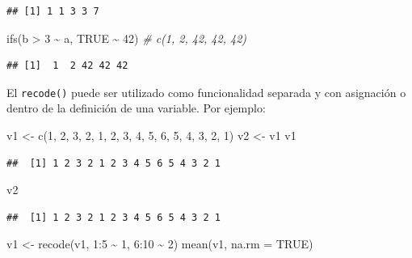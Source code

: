 \documentclass[
]{book}
\newenvironment{Shaded}{\begin{snugshade}}{\end{snugshade}}
\newcommand{\AttributeTok}[1]{\textcolor[rgb]{0.77,0.63,0.00}{#1}}
\newcommand{\CommentTok}[1]{\textcolor[rgb]{0.56,0.35,0.01}{\textit{#1}}}
\newcommand{\ConstantTok}[1]{\textcolor[rgb]{0.00,0.00,0.00}{#1}}
\newcommand{\DecValTok}[1]{\textcolor[rgb]{0.00,0.00,0.81}{#1}}
\newcommand{\FunctionTok}[1]{\textcolor[rgb]{0.00,0.00,0.00}{#1}}
\newcommand{\NormalTok}[1]{#1}
\newcommand{\OtherTok}[1]{\textcolor[rgb]{0.56,0.35,0.01}{#1}}
\newcommand{\SpecialCharTok}[1]{\textcolor[rgb]{0.00,0.00,0.00}{#1}}
\begin{document}
\begin{verbatim}
## [1] 1 1 3 3 7
\end{verbatim}

\begin{Shaded}
\begin{Highlighting}[]
\FunctionTok{ifs}\NormalTok{(b }\SpecialCharTok{\textgreater{}} \DecValTok{3} \SpecialCharTok{\textasciitilde{}}\NormalTok{ a, }\ConstantTok{TRUE} \SpecialCharTok{\textasciitilde{}} \DecValTok{42}\NormalTok{)  }\CommentTok{\# c(1, 2, 42, 42, 42)}
\end{Highlighting}
\end{Shaded}

\begin{verbatim}
## [1]  1  2 42 42 42
\end{verbatim}

El \texttt{recode()} puede ser utilizado como funcionalidad separada y con asignación o dentro de la definición de una variable. Por ejemplo:

\begin{Shaded}
\begin{Highlighting}[]
\NormalTok{v1 }\OtherTok{\textless{}{-}} \FunctionTok{c}\NormalTok{(}\DecValTok{1}\NormalTok{, }\DecValTok{2}\NormalTok{, }\DecValTok{3}\NormalTok{, }\DecValTok{2}\NormalTok{, }\DecValTok{1}\NormalTok{, }\DecValTok{2}\NormalTok{, }\DecValTok{3}\NormalTok{, }\DecValTok{4}\NormalTok{, }\DecValTok{5}\NormalTok{, }\DecValTok{6}\NormalTok{, }\DecValTok{5}\NormalTok{, }\DecValTok{4}\NormalTok{, }\DecValTok{3}\NormalTok{, }\DecValTok{2}\NormalTok{, }\DecValTok{1}\NormalTok{)}
\NormalTok{v2 }\OtherTok{\textless{}{-}}\NormalTok{ v1}
\NormalTok{v1}
\end{Highlighting}
\end{Shaded}

\begin{verbatim}
##  [1] 1 2 3 2 1 2 3 4 5 6 5 4 3 2 1
\end{verbatim}

\begin{Shaded}
\begin{Highlighting}[]
\NormalTok{v2}
\end{Highlighting}
\end{Shaded}

\begin{verbatim}
##  [1] 1 2 3 2 1 2 3 4 5 6 5 4 3 2 1
\end{verbatim}

\begin{Shaded}
\begin{Highlighting}[]
\NormalTok{v1 }\OtherTok{\textless{}{-}} \FunctionTok{recode}\NormalTok{(v1, }\DecValTok{1}\SpecialCharTok{:}\DecValTok{5} \SpecialCharTok{\textasciitilde{}} \DecValTok{1}\NormalTok{, }\DecValTok{6}\SpecialCharTok{:}\DecValTok{10} \SpecialCharTok{\textasciitilde{}} \DecValTok{2}\NormalTok{)}
\FunctionTok{mean}\NormalTok{(v1, }\AttributeTok{na.rm =} \ConstantTok{TRUE}\NormalTok{)}
\end{Highlighting}
\end{Shaded}
\end{document}
